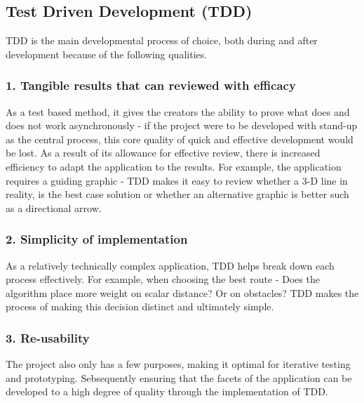
\subsection*{Test Driven Development (TDD)}

TDD is the main developmental process of choice, both during and after development because of the following qualities. 

\subsubsection{1. Tangible results that can reviewed with efficacy}
As a test based method, it gives the creators the ability to prove what does and does not work asynchronously - if the project were to be developed with stand-up as the central process, this core quality of quick and effective development would be lost. As a result of its allowance for effective review, there is increased efficiency to adapt the application to the results. For example, the application requires a guiding graphic - TDD makes it easy to review whether a 3-D line in reality, is the best case solution or whether an alternative graphic is better such as a directional arrow.

\subsubsection{2. Simplicity of implementation}
As a relatively technically complex application, TDD helps break down each process effectively. For example, when choosing the best route - Does the algorithm place more weight on scalar distance? Or on obstacles? TDD makes the process of making this decision distinct and ultimately simple.

\subsubsection{3. Re-usability}
The project also only has a few purposes, making it optimal for iterative testing and prototyping. Sebsequently ensuring that the facets of the application can be developed to a high degree of quality through the implementation of TDD.